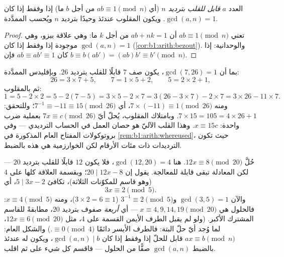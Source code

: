 \begin{proposition}\label{prop:b1:arith:invmod}
العدد $a$ \emph{قابل للقلب بترديد $n$} (أي $ab \equiv 1 \pmod n$ من أجل
$b$ ما) إذا وفقط إذا كان $\gcd(a, n) = 1$. ويكون المقلوب عندئذ وحيدًا بترديد
$n$ ويُحسب  الممدَّدة.
\end{proposition}

\begin{proof}
تعني $ab \equiv 1 \pmod n$ أن $ab + nk = 1$ من أجل $k$ ما: وهي
علاقة بيزو، وهي موجودة إذا وفقط إذا كان $\gcd(a,n) = 1$
(\cref{cor:b1:arith:bezout}). والوحدانية: إذا كان $ab \equiv ab' \equiv 1$
فإن $b \equiv b(ab') = (ab)b' \equiv b' \pmod n$.
\end{proof}

\begin{example}\label{ex:b1:arith:inv7mod26}
بما أن $\gcd(7, 26) = 1$، يكون صف $7$ قابلًا للقلب بترديد $26$.
وبإقليدس الممدَّدة:
\[
26 = 3 \times 7 + 5, \qquad
7 = 1 \times 5 + 2, \qquad
5 = 2 \times 2 + 1 ,
\]
ثم بالمقلوب:
\[
1 = 5 - 2 \times 2 = 5 - 2(7 - 5) = 3 \times 5 - 2 \times 7
= 3(26 - 3 \times 7) - 2 \times 7 = 3 \times 26 - 11 \times 7 .
\]
ومنه $7 \times (-11) \equiv 1 \pmod{26}$، أي $7^{-1} \equiv
-11 \equiv 15 \pmod{26}$؛ وللتحقق: $7 \times 15 = 105 = 4 \times 26
+ 1$. وبامتلاك المقلوب، يُحلّ أيّ  $7x \equiv c
\pmod{26}$ بعملية ضرب واحدة: $x \equiv 15c$. وهذا
القلب الآليّ هو حصان العمل في الحساب الترديدي ---
وفي بروتوكولات المفتاح العام المذكورة في
\cref{rem:b1:arith:whereused}، حيث تكون الترديدات ذات مئات
الأرقام لكن الخوارزمية هي هذه بالضبط.
\end{example}

\begin{example}\label{ex:b1:arith:noninvertible}
حُلَّ $12x \equiv 8 \pmod{20}$. هنا $\gcd(12, 20) = 4$، فلا يكون $12$
قابلًا للقلب بترديد $20$ --- لكن المعادلة تبقى
قابلة للمعالجة. يقول  إن $20 \mid 12x - 8$؛ وبقسمة
العلاقة كلها على $4$ (وهو قاسم للمكوّنات الثلاثة)، تكافئ
$5 \mid 3x - 2$، أي
\[
3x \equiv 2 \pmod 5 .
\]
والآن $\gcd(3, 5) = 1$ و$3^{-1} \equiv 2 \pmod 5$ ($3 \times 2 =
6 \equiv 1$)، ومنه $x \equiv 4 \pmod 5$: فالحلول هي $x
\equiv 4, 9, 14, 19 \pmod{20}$ --- أي \emph{أربعة} صفوف بترديد $20$،
مطابقةً للقاسم المشترك الأكبر. (ولو لم يقبل الطرف الأيمن القسمة على $4$،
مثل $12x \equiv 6 \pmod{20}$، لما وُجد أيّ حلّ البتة:
فالطرف الأيسر دائمًا $\equiv 0 \pmod 4$.) والشكل العام: $ax
\equiv b \pmod n$ قابل للحلّ إذا وفقط إذا كان $\gcd(a, n) \mid b$، ويكون له عندئذ
بالضبط $\gcd(a, n)$ صفًّا من الحلول --- فاقسم كل شيء
على  ثم اقلب.
\end{example}

